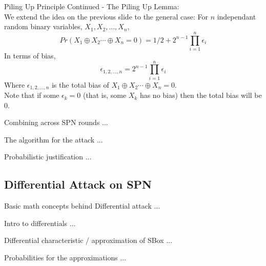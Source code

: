 \documentclass[9pt]{beamer}
\begin{document}
\begin{frame}
Piling Up Principle Continued - The Piling Up Lemma:\\
\vspace{5mm}
We extend the idea on the previous slide to the general case: For $n$ independant random binary variables, $X_1, X_2, \dots, X_n$, 
\[ Pr(X_1 \oplus X_2 \cdots \oplus X_n = 0) = 1/2 + 2^{n-1} \prod_{i=1}^n \epsilon_i \]
In terms of bias,
\[ \epsilon_{1,2,\dots,n} = 2^{n-1} \prod_{i = 1}^n \epsilon_i \]
Where $\epsilon_{1,2,\dots,n}$ is the total bias of $X_1 \oplus X_2 \cdots \oplus X_n = 0$. \\
\vspace{5mm}
Note that if some $\epsilon_k = 0$ (that is, some $X_k$ has no bias) then the total bias will be $0$.  
\end{frame}

\begin{frame}
Combining across SPN rounds ... 

\end{frame}

\begin{frame}
The algorithm for the attack ... 

\end{frame}

\begin{frame}
Probabilistic justification ...

\end{frame}

\subsection{Differential Attack on SPN}
\begin{frame}
Basic math concepts behind Differential attack ...

\end{frame}

\begin{frame}
Intro to differentials ... 

\end{frame}

\begin{frame}
Differential characteristic / approximation of SBox ...

\end{frame}

\begin{frame}
Probabilities for the approximations ...

\end{frame}
\end{document}
